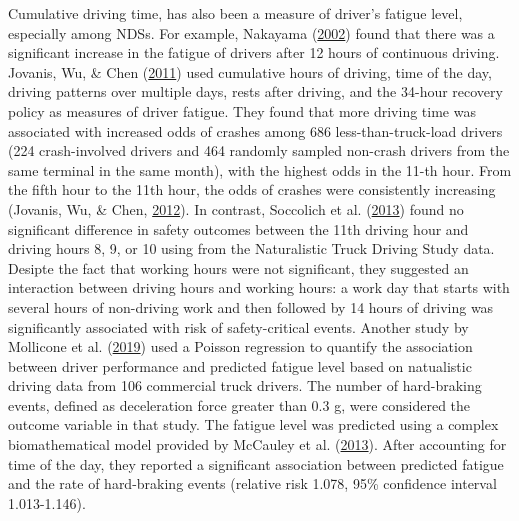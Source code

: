 \documentclass[12pt]{book}
\numberwithin{equation}{chapter}
\begin{document}
Cumulative driving time, has also been a measure of driver's fatigue level, especially among NDSs. For example, Nakayama (\protect\hyperlink{ref-nakayama2002trial}{2002}) found that there was a significant increase in the fatigue of drivers after 12 hours of continuous driving. Jovanis, Wu, \& Chen (\protect\hyperlink{ref-jovanis2011hours}{2011}) used cumulative hours of driving, time of the day, driving patterns over multiple days, rests after driving, and the 34-hour recovery policy as measures of driver fatigue. They found that more driving time was associated with increased odds of crashes among 686 less-than-truck-load drivers (224 crash-involved drivers and 464 randomly sampled non-crash drivers from the same terminal in the same month), with the highest odds in the 11-th hour. From the fifth hour to the 11th hour, the odds of crashes were consistently increasing (Jovanis, Wu, \& Chen, \protect\hyperlink{ref-jovanis2012effects}{2012}). In contrast, Soccolich et al. (\protect\hyperlink{ref-soccolich2013analysis}{2013}) found no significant difference in safety outcomes between the 11th driving hour and driving hours 8, 9, or 10 using from the Naturalistic Truck Driving Study data. Desipte the fact that working hours were not significant, they suggested an interaction between driving hours and working hours: a work day that starts with several hours of non-driving work and then followed by 14 hours of driving was significantly associated with risk of safety-critical events. Another study by Mollicone et al. (\protect\hyperlink{ref-mollicone2019predicting}{2019}) used a Poisson regression to quantify the association between driver performance and predicted fatigue level based on natualistic driving data from 106 commercial truck drivers. The number of hard-braking events, defined as deceleration force greater than 0.3 g, were considered the outcome variable in that study. The fatigue level was predicted using a complex biomathematical model provided by McCauley et al. (\protect\hyperlink{ref-mccauley2013dynamic}{2013}). After accounting for time of the day, they reported a significant association between predicted fatigue and the rate of hard-braking events (relative risk 1.078, 95\% confidence interval 1.013-1.146).
\end{document}
